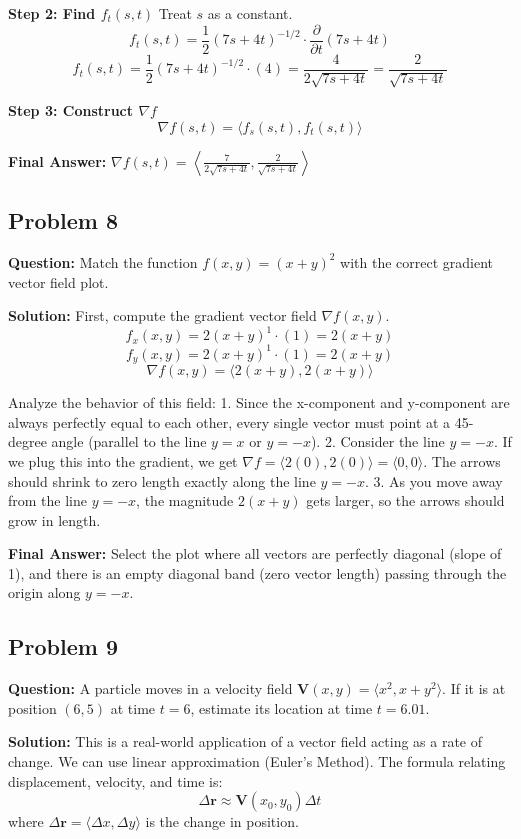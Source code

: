 \documentclass[11pt]{article}
\begin{document}
\textbf{Step 2: Find $f_t(s, t)$}
Treat $s$ as a constant.
\[ f_t(s, t) = \frac{1}{2}(7s + 4t)^{-1/2} \cdot \frac{\partial}{\partial t}(7s + 4t) \]
\[ f_t(s, t) = \frac{1}{2}(7s + 4t)^{-1/2} \cdot (4) = \frac{4}{2\sqrt{7s + 4t}} = \frac{2}{\sqrt{7s + 4t}} \]

\textbf{Step 3: Construct $\nabla f$}
\[ \nabla f(s, t) = \langle f_s(s, t), f_t(s, t) \rangle \]

\textbf{Final Answer:} 
$\nabla f(s, t) = \left\langle \frac{7}{2\sqrt{7s + 4t}}, \frac{2}{\sqrt{7s + 4t}} \right\rangle$

\subsection*{Problem 8}
\textbf{Question:} Match the function $f(x,y) = (x+y)^2$ with the correct gradient vector field plot.

\textbf{Solution:}
First, compute the gradient vector field $\nabla f(x, y)$.
\[ f_x(x, y) = 2(x+y)^1 \cdot (1) = 2(x+y) \]
\[ f_y(x, y) = 2(x+y)^1 \cdot (1) = 2(x+y) \]
\[ \nabla f(x, y) = \langle 2(x+y), 2(x+y) \rangle \]

Analyze the behavior of this field:
1. Since the x-component and y-component are always perfectly equal to each other, every single vector must point at a 45-degree angle (parallel to the line $y=x$ or $y=-x$).
2. Consider the line $y = -x$. If we plug this into the gradient, we get $\nabla f = \langle 2(0), 2(0) \rangle = \langle 0, 0 \rangle$. The arrows should shrink to zero length exactly along the line $y = -x$.
3. As you move away from the line $y=-x$, the magnitude $2(x+y)$ gets larger, so the arrows should grow in length.

\textbf{Final Answer:} Select the plot where all vectors are perfectly diagonal (slope of 1), and there is an empty diagonal band (zero vector length) passing through the origin along $y = -x$.

\subsection*{Problem 9}
\textbf{Question:} A particle moves in a velocity field $\mathbf{V}(x, y) = \langle x^2, x + y^2 \rangle$. If it is at position $(6, 5)$ at time $t = 6$, estimate its location at time $t = 6.01$.

\textbf{Solution:}
This is a real-world application of a vector field acting as a rate of change. We can use linear approximation (Euler's Method).
The formula relating displacement, velocity, and time is:
\[ \Delta \mathbf{r} \approx \mathbf{V}(x_0, y_0) \Delta t \]
where $\Delta \mathbf{r} = \langle \Delta x, \Delta y \rangle$ is the change in position.
\end{document}
